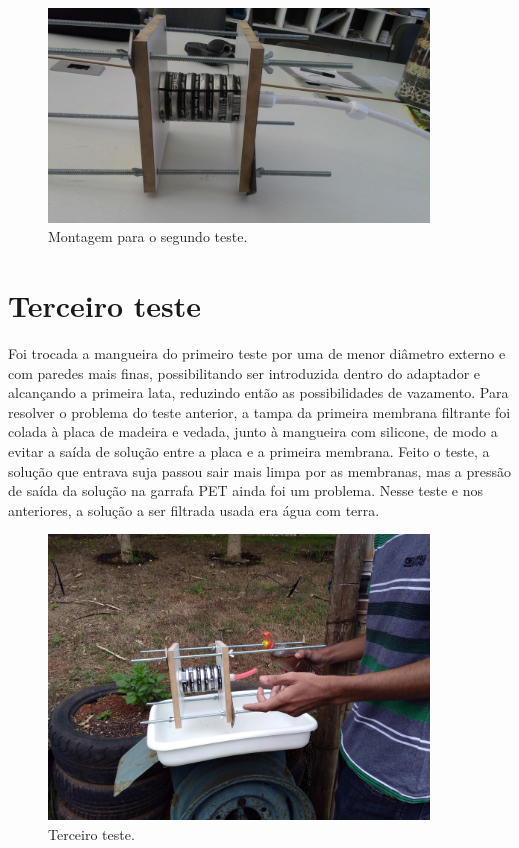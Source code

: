 \begin{figure}[H]
  \centering
  \includegraphics[width=0.9\textwidth]{figuras/segundo_teste.png}
  \caption{Montagem para o segundo teste.\label{fig:segundo_teste}}
\end{figure}


\section{Terceiro teste}\label{sec:terceiro_teste}

Foi trocada a mangueira do primeiro teste por uma de menor diâmetro externo e
com paredes mais finas, possibilitando ser introduzida dentro do adaptador e
alcançando a primeira lata, reduzindo então as possibilidades de vazamento. Para
resolver o problema do teste anterior, a tampa da primeira membrana filtrante
foi colada à placa de madeira e vedada, junto à mangueira com silicone, de modo
a evitar a saída de solução entre a placa e a primeira membrana. Feito o teste,
a solução que entrava suja passou sair mais limpa por as membranas, mas a
pressão de saída da solução na garrafa PET ainda foi um problema. Nesse teste e
nos anteriores, a solução a ser filtrada usada era água com terra.

\begin{figure}[H]
  \centering
  \includegraphics[width=0.9\textwidth]{figuras/terceiro_teste.png}
  \caption{Terceiro teste.\label{fig:terceiro_teste}}
\end{figure}


